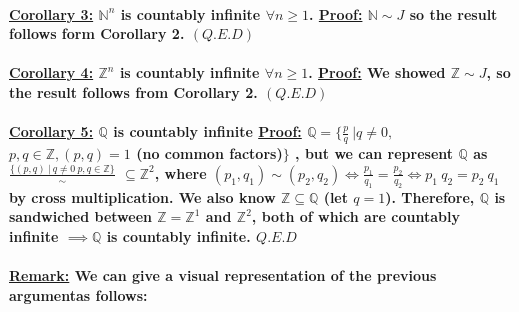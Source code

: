 \documentclass[10pt,a4paper]{article}
\begin{document}
\paragraph{\underline{Corollary 3:} $\mathbb{N}^{n}$ is countably infinite $\forall n \geq 1$.
\newline 
\underline{Proof:} $\mathbb{N} \sim J$ so the result follows form Corollary 2. $(Q.E.D)$}

\paragraph{\underline{Corollary 4:} $\mathbb{Z}^{n}$ is countably infinite $\forall n \geq 1$.
\newline
\underline{Proof:} We showed $\mathbb{Z} \sim J$, so the result follows from Corollary 2. $(Q.E.D)$}

\paragraph{\underline{Corollary 5:} $\mathbb{Q}$ is countably infinite
\newline
\underline{Proof:} $\mathbb{Q} = \lbrace \frac{p}{q} \ |  q \neq 0,$ $ p,q \in \mathbb{Z}, (p,q) = 1$ (no common factors)$ \rbrace$ , but we can represent $\mathbb{Q}$ as $\frac{\lbrace (p,q) \  | \ q \neq 0 \  p,q \in \mathbb{Z} \rbrace }{ \sim }$ $ \subseteq \mathbb{Z}^{2}$, where $(p_{1},q_{1}) \sim (p_{2},q_{2}) \iff \frac{p_{1}}{q_{1}} = \frac{p_{2}}{q_{2}} \iff p_{1} \ q_{2} = p_{2} \ q_{1}$ by cross multiplication. We also know $\mathbb{Z} \subseteq \mathbb{Q}$ (let $q = 1$). Therefore, $\mathbb{Q}$ is sandwiched between $\mathbb{Z} = \mathbb{Z}^{1}$ and $\mathbb{Z}^{2}$, both of which are countably infinite $\implies \mathbb{Q}$ is countably infinite. $Q.E.D$}
\newpage

\paragraph{\underline{Remark:} \newline We can give a visual representation of the previous argument\newline as follows:\newline }
\paragraph{}
\end{document}
